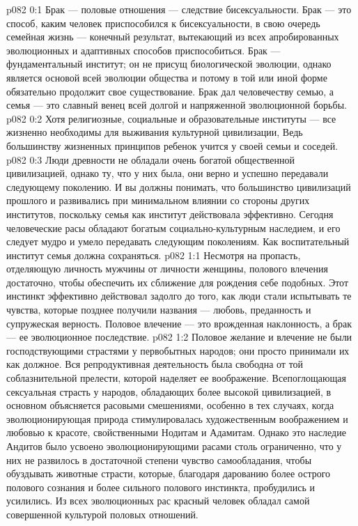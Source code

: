\vs p082 0:1 Брак --- половые отношения --- следствие бисексуальности. Брак --- это способ, каким человек приспособился к бисексуальности, в свою очередь семейная жизнь --- конечный результат, вытекающий из всех апробированных эволюционных и адаптивных способов приспособиться. Брак --- фундаментальный институт; он не присущ биологической эволюции, однако является основой всей эволюции общества и потому в той или иной форме обязательно продолжит свое существование. Брак дал человечеству семью, а семья --- это славный венец всей долгой и напряженной эволюционной борьбы.
\vs p082 0:2 Хотя религиозные, социальные и образовательные институты --- все жизненно необходимы для выживания культурной цивилизации,  Ведь большинству жизненных принципов ребенок учится у своей семьи и соседей.
\vs p082 0:3 Люди древности не обладали очень богатой общественной цивилизацией, однако ту, что у них была, они верно и успешно передавали следующему поколению. И вы должны понимать, что большинство цивилизаций прошлого и развивались при минимальном влиянии со стороны других институтов, поскольку семья как институт действовала эффективно. Сегодня человеческие расы обладают богатым социально\hyp{}культурным наследием, и его следует мудро и умело передавать следующим поколениям. Как воспитательный институт семья должна сохраняться.
\vs p082 1:1 Несмотря на пропасть, отделяющую личность мужчины от личности женщины, полового влечения достаточно, чтобы обеспечить их сближение для рождения себе подобных. Этот инстинкт эффективно действовал задолго до того, как люди стали испытывать те чувства, которые позднее получили названия --- любовь, преданность и супружеская верность. Половое влечение --- это врожденная наклонность, а брак --- ее эволюционное последствие.
\vs p082 1:2 Половое желание и влечение не были господствующими страстями у первобытных народов; они просто принимали их как должное. Вся репродуктивная деятельность была свободна от той соблазнительной прелести, которой наделяет ее воображение. Всепоглощающая сексуальная страсть у народов, обладающих более высокой цивилизацией, в основном объясняется расовыми смешениями, особенно в тех случаях, когда эволюционирующая природа стимулировалась художественным воображением и любовью к красоте, свойственными Нодитам и Адамитам. Однако это наследие Андитов было усвоено эволюционирующими расами столь ограниченно, что у них не развилось в достаточной степени чувство самообладания, чтобы обуздывать животные страсти, которые, благодаря дарованию более острого полового сознания и более сильного полового инстинкта, пробудились и усилились. Из всех эволюционных рас красный человек обладал самой совершенной культурой половых отношений.

